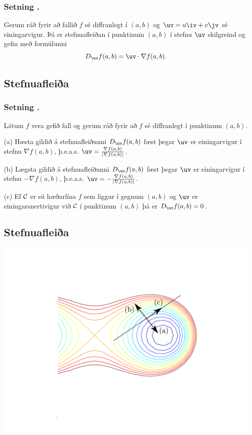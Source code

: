 \subsubsection{Setning \kaflanr.}
Gerum ráð fyrir að fallið $f$ sé diffranlegt í
$(a,b)$ og $\uv=u\iv+v\jv$ sé einingarvigur.  Þá er stefnuafleiðan í
punktinum $(a,b)$ í stefnu $\uv$ skilgreind og gefin með formúlunni
$$D_{\uv}f(a,b)=\uv\cdot \nabla f(a,b).$$




\subsection{Stefnuafleiða} 

\subsubsection{Setning \kaflanr.}
 Látum $f$ vera gefið fall og gerum ráð fyrir að
$f$ sé diffranlegt í punktinum $(a,b)$.

\medskip
(a)  Hæsta gildið á stefnuafleiðunni $D_{\uv}f(a,b)$ fæst þegar $\uv$
er einingarvigur í stefnu $\nabla f(a,b)$, þ.e.a.s. $\uv=\frac{\nabla
  f(a,b)}{|\nabla f(a,b)|}$.  

\medskip
(b)  Lægsta gildið á stefnuafleiðunni $D_{\uv}f(a,b)$ fæst þegar $\uv$
er einingarvigur í stefnu $-\nabla f(a,b)$, þ.e.a.s. $\uv=-\frac{\nabla
  f(a,b)}{|\nabla f(a,b)|}$. 

\medskip
(c)  Ef $\cal C$ er sú hæðarlína $f$ sem liggur í gegnum $(a,b)$ og
$\uv$ er einingarsnertivigur við $\cal C$ í punktinum $(a,b)$ þá er
$D_{\uv}f(a,b)=0$.  






\subsection{Stefnuafleiða}
   \centering
            \includegraphics[width=1\linewidth]{contours.pdf}



